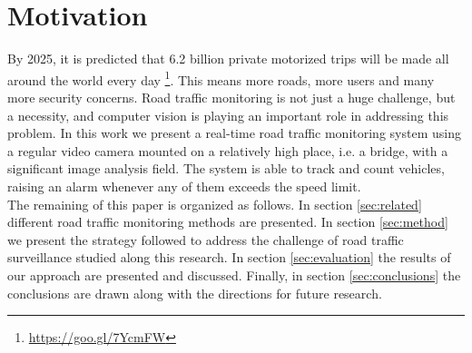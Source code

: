 \section{Motivation}
\label{sec:intro}

By 2025, it is predicted that 6.2 billion private motorized trips will be made all around the world every day \footnote{\url{https://goo.gl/7YcmFW}}. This means more roads, more users and many more security concerns. Road traffic monitoring is not just a huge challenge, but a necessity, and computer vision is playing an important role in addressing this problem. In this work we present a real-time road traffic monitoring system using a regular video camera mounted on a relatively high place, i.e. a bridge, with a significant image analysis field. The system is able to track and count vehicles, raising an alarm whenever any of them exceeds the speed limit.\\

\noindent The remaining of this paper is organized as follows. In section \ref{sec:related} different road traffic monitoring methods are presented. In section \ref{sec:method} we present the strategy followed to address the challenge of road traffic surveillance studied along this research. In section \ref{sec:evaluation} the results of our approach are presented and discussed. Finally, in section \ref{sec:conclusions} the conclusions are drawn along with the directions for future research.